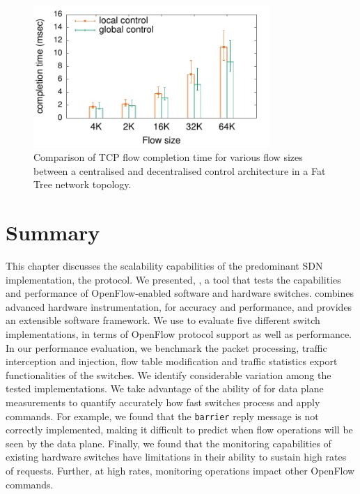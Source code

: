 \begin{figure}[h]
  \begin{center}
    \includegraphics[width=0.80\textwidth]{Chapter1/Chapter1Figs/sdnsim-use-case}
  \end{center}
  \caption[Hierarchical control evaluation result]{Comparison of TCP flow completion time for various flow sizes between
    a centralised and decentralised control architecture in a Fat Tree
    network topology.}
  \label{fig:sdnsim-use-case-result}
\end{figure}


\section{Summary} \label{sec:modeling:summary}



This chapter discusses the scalability capabilities of the predominant SDN
implementation, the \of protocol.  We presented, \oflops, a tool that tests the
capabilities and performance of OpenFlow-enabled software and hardware switches.
\oflops combines advanced hardware instrumentation, for accuracy and
performance, and provides an extensible software framework. We use \oflops to
evaluate five different \of switch implementations, in terms of OpenFlow
protocol support as well as performance.  In our performance evaluation, we
benchmark the packet processing, traffic interception and injection, flow table
modification and traffic statistics export functionalities of the switches.  We
identify considerable variation among the tested \of implementations.  We take
advantage of the ability of \oflops for data plane measurements to quantify
accurately how fast switches process and apply \of commands.  For example, we
found that the \texttt{barrier} reply message is not correctly implemented,
making it difficult to predict when flow operations will be seen by the data
plane.  Finally, we found that the monitoring capabilities of existing hardware
switches have limitations in their ability to sustain high rates of requests.
Further, at high rates, monitoring operations impact other OpenFlow commands.

